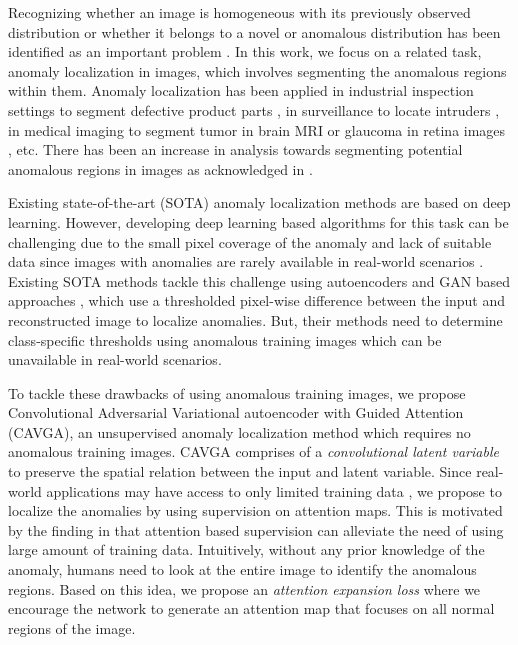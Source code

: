 \documentclass[runningheads]{llncs}
\begin{document}
\begin{figure}[!ht]
    \label{intro_fig}

\end{figure}

Recognizing whether an image is homogeneous with its previously observed distribution or whether it belongs to a novel or anomalous distribution has been identified as an important problem \cite{bergmann2019mvtec}. In this work, we focus on a related task, anomaly localization in images, which involves segmenting the anomalous regions within them. Anomaly localization has been applied in industrial inspection settings to segment defective product parts \cite{bergmann2019mvtec}, in surveillance to locate intruders \cite{nguyen2018weakly}, in medical imaging to segment tumor in brain MRI or glaucoma in retina images \cite{baur2018deep, Li_2019_CVPR}, etc. There has been an increase in analysis towards segmenting potential anomalous regions in images as acknowledged in \cite{dehaene2020iterative}.


Existing state-of-the-art (SOTA) anomaly localization methods \cite{sabokrou2018avid, bergmann2018improving} are based on deep learning. However, developing deep learning based algorithms for this task can be challenging due to the small pixel coverage of the anomaly and lack of suitable data since images with anomalies are rarely available in real-world scenarios \cite{bergmann2019mvtec}. Existing SOTA methods tackle this challenge using autoencoders \cite{sabokrou2018avid, dimokranitou2017adversarial} and GAN based approaches \cite{ravanbakhsh2019training, zenati2018efficient, akcay2018ganomaly}, which use a thresholded pixel-wise difference between the input and reconstructed image to localize anomalies. But, their methods need to determine class-specific thresholds using anomalous training images which can be unavailable in real-world scenarios.

To tackle these drawbacks of using anomalous training images, we propose Convolutional Adversarial Variational autoencoder with Guided Attention\\ (CAVGA), an unsupervised anomaly localization method which requires no anomalous training images. CAVGA comprises of a \textit{convolutional latent variable} to preserve the spatial relation between the input and latent variable. Since real-world applications may have access to only limited training data \cite{bergmann2019mvtec}, we propose to localize the anomalies by  using supervision on attention maps. This is motivated by the finding in \cite{li2018tell} that attention based supervision can alleviate the need of using large amount of training data. Intuitively, without any prior knowledge of the anomaly, humans need to look at the entire image to identify the anomalous regions. Based on this idea, we propose an \textit{attention expansion loss} where we encourage the network to generate an attention map that focuses on all normal regions of the image. 
\end{document}
